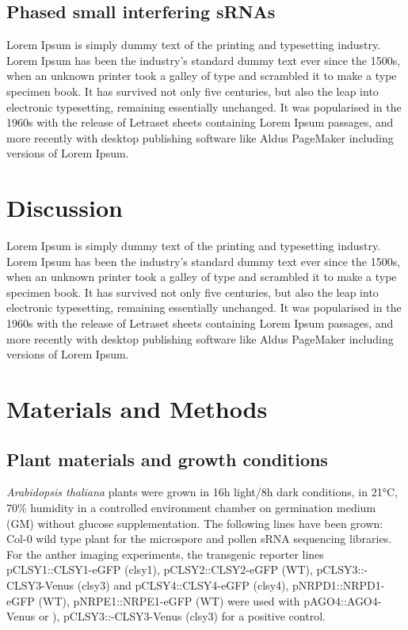 \subsection{Phased small interfering sRNAs}
Lorem Ipsum is simply dummy text of the printing and typesetting industry. Lorem Ipsum has been the industry's standard dummy text ever since the 1500s, when an unknown printer took a galley of type and scrambled it to make a type specimen book. It has survived not only five centuries, but also the leap into electronic typesetting, remaining essentially unchanged. It was popularised in the 1960s with the release of Letraset sheets containing Lorem Ipsum passages, and more recently with desktop publishing software like Aldus PageMaker including versions of Lorem Ipsum.


\section{Discussion}
Lorem Ipsum is simply dummy text of the printing and typesetting industry. Lorem Ipsum has been the industry's standard dummy text ever since the 1500s, when an unknown printer took a galley of type and scrambled it to make a type specimen book. It has survived not only five centuries, but also the leap into electronic typesetting, remaining essentially unchanged. It was popularised in the 1960s with the release of Letraset sheets containing Lorem Ipsum passages, and more recently with desktop publishing software like Aldus PageMaker including versions of Lorem Ipsum.

\section{Materials and Methods}

\subsection{Plant materials and growth conditions}

\textit{Arabidopsis thaliana} plants were grown in 16h light/8h dark conditions, in 21°C, 70\% humidity in a controlled environment chamber on germination medium (GM) without glucose supplementation. The following lines have been grown: Col-0 wild type plant for the microspore and pollen sRNA sequencing libraries. For the anther imaging experiments, the transgenic reporter lines pCLSY1::CLSY1-eGFP (clsy1), pCLSY2::CLSY2-eGFP (WT), pCLSY3::-CLSY3-Venus (clsy3) and pCLSY4::CLSY4-eGFP (clsy4), pNRPD1::NRPD1-eGFP (WT), pNRPE1::NRPE1-eGFP (WT) were used with pAGO4::AGO4-Venus or ), pCLSY3::-CLSY3-Venus (clsy3) for a positive control.

